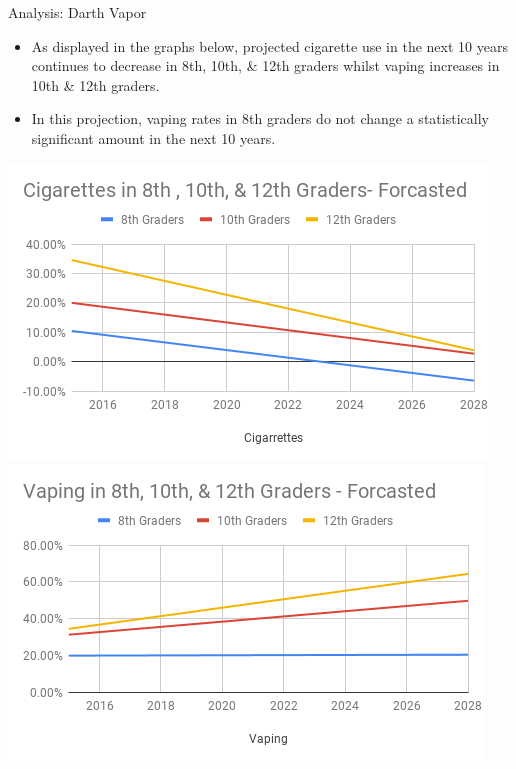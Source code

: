 \documentclass{beamer}
\begin{document}
\begin{frame}{Analysis: Darth Vapor}
        \begin{itemize}
        \item As displayed in the graphs below, projected cigarette use in the next 10 years continues to decrease in 8th, 10th, \& 12th graders whilst vaping increases in 10th \& 12th graders. 
        \item In this projection, vaping rates in 8th graders do not change a statistically significant amount in the next 10 years. 
        \end{itemize}
    \includegraphics[scale=.35]{images/darthvapor-cigarettes.png}
    \includegraphics[scale=.35]{images/darthvapor-vaping.png}
    
\end{frame}
\end{document}
